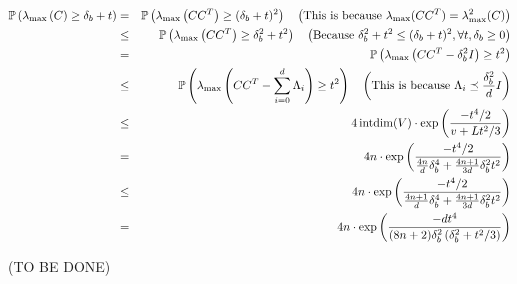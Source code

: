 \documentclass[12pt]{article}
\begin{document}
\begin{eqnarray*}
\Prob \left( \lambda_{\max}\left(C\right) \geq \delta_b + t \right) 
	&=& \Prob \left( \lambda_{\max}\left(CC^T\right) \geq (\delta_b + t)^2 \right) \quad \left(\text{This is because }\lambda_{\max}(CC^T) = \lambda^2_{\max}(C) \right) \\
	&\leq& \Prob \left( \lambda_{\max}\left(CC^T\right) \geq \delta^2_b + t^2 \right) \quad \left(\text{Because } \delta^2_b + t^2 \leq (\delta_b + t)^2, \forall t, \delta_b \geq 0 \right) \\
	&=& \Prob \left( \lambda_{\max}\left(CC^T - \delta^2_b I\right) \geq t^2 \right)  \\
	&\leq& \Prob \left( \lambda_{\max}\left(CC^T - \sum^d_{i=0} \Lambda_i\right) \geq t^2 \right) \quad \left(\text{This is because } \Lambda_i \preceq \frac{\delta^2_b}{d} I \right) \\
	&\leq& 4 \operatorname{intdim}(V) \cdot \exp\left(\frac{-t^4/2}{v + Lt^2/3} \right) \\
	&=& 4n\cdot \exp\left( \frac{-t^4/2}{\frac{4n}{d}\delta^4_b + \frac{4n+1}{3d}\delta^2_b t^2}\right) \\
	&\leq& 4n\cdot \exp\left( \frac{-t^4/2}{\frac{4n + 1}{d}\delta^4_b + \frac{4n+1}{3d}\delta^2_b t^2}\right) \\
	&=& 4n\cdot \exp\left( \frac{-dt^4}{(8n + 2)\delta^2_b\left(\delta^2_b + t^2/3 \right)}\right)
\end{eqnarray*}
	
(TO BE DONE)

\end{document}
